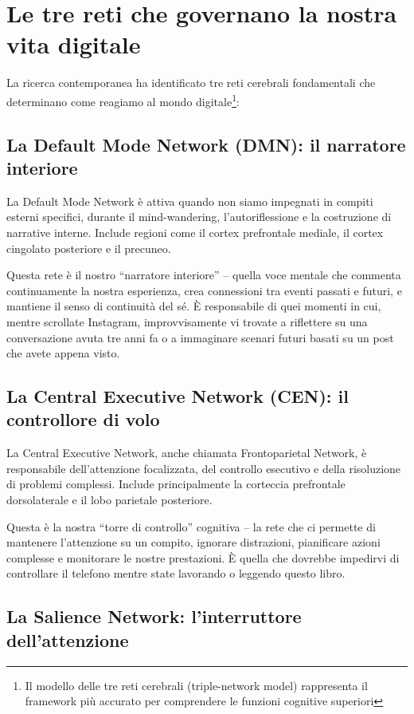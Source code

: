 \section{Le tre reti che governano la nostra vita digitale}

La ricerca contemporanea ha identificato tre reti cerebrali fondamentali che determinano come reagiamo al mondo digitale\footnote{Il modello delle tre reti cerebrali (triple-network model) rappresenta il framework più accurato per comprendere le funzioni cognitive superiori}:

\subsection{La Default Mode Network (DMN): il narratore interiore}

La Default Mode Network è attiva quando non siamo impegnati in compiti esterni specifici, durante il mind-wandering, l'autoriflessione e la costruzione di narrative interne. Include regioni come il cortex prefrontale mediale, il cortex cingolato posteriore e il precuneo.

Questa rete è il nostro ``narratore interiore'' – quella voce mentale che commenta continuamente la nostra esperienza, crea connessioni tra eventi passati e futuri, e mantiene il senso di continuità del sé. È responsabile di quei momenti in cui, mentre scrollate Instagram, improvvisamente vi trovate a riflettere su una conversazione avuta tre anni fa o a immaginare scenari futuri basati su un post che avete appena visto.

\subsection{La Central Executive Network (CEN): il controllore di volo}

La Central Executive Network, anche chiamata Frontoparietal Network, è responsabile dell'attenzione focalizzata, del controllo esecutivo e della risoluzione di problemi complessi. Include principalmente la corteccia prefrontale dorsolaterale e il lobo parietale posteriore.

Questa è la nostra ``torre di controllo'' cognitiva – la rete che ci permette di mantenere l'attenzione su un compito, ignorare distrazioni, pianificare azioni complesse e monitorare le nostre prestazioni. È quella che dovrebbe impedirvi di controllare il telefono mentre state lavorando o leggendo questo libro.

\subsection{La Salience Network: l'interruttore dell'attenzione}

